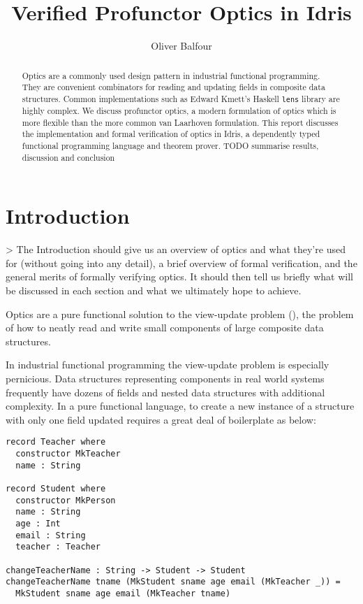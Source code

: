 \documentclass[]{report}
\title{Verified Profunctor Optics in Idris}
\author{Oliver Balfour}
\begin{document}
\maketitle

\begin{abstract}
	Optics are a commonly used design pattern in industrial functional programming. They are convenient combinators for reading and updating fields in composite data structures. Common implementations such as Edward Kmett's Haskell \texttt{lens} library are highly complex. We discuss profunctor optics, a modern formulation of optics which is more flexible than the more common van Laarhoven formulation. This report discusses the implementation and formal verification of optics in Idris, a dependently typed functional programming language and theorem prover. TODO summarise results, discussion and conclusion
\end{abstract}

\tableofcontents
\newpage

\section{Introduction}

> The Introduction should give us an overview of optics and what they're used for (without going into any detail), a brief overview of formal verification, and the general merits of formally verifying optics. It should then tell us briefly what will be discussed in each section and what we ultimately hope to achieve.

Optics are a pure functional solution to the view-update problem (\cite{foster2005combinators}), the problem of how to neatly read and write small components of large composite data structures.

In industrial functional programming the view-update problem is especially pernicious. Data structures representing components in real world systems frequently have dozens of fields and nested data structures with additional complexity. In a pure functional language, to create a new instance of a structure with only one field updated requires a great deal of boilerplate as below:

\begin{verbatim}
record Teacher where
  constructor MkTeacher
  name : String

record Student where
  constructor MkPerson
  name : String
  age : Int
  email : String
  teacher : Teacher

changeTeacherName : String -> Student -> Student
changeTeacherName tname (MkStudent sname age email (MkTeacher _)) =
  MkStudent sname age email (MkTeacher tname)
\end{verbatim}
\end{document}
